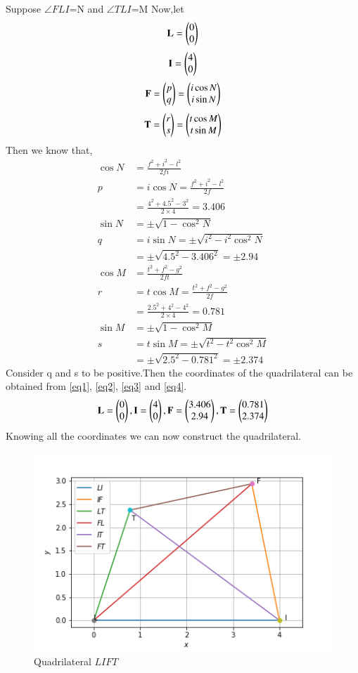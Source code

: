 \documentclass[journal,12pt,twocolumn]{IEEEtran}
\begin{document}
Suppose $\angle FLI$=N and  $\angle TLI$=M
Now,let
\begin{equation}
   \mathbf{L}=\begin{pmatrix}0\\0\end{pmatrix} \label{eq1}
\end{equation}
\begin{equation}
    \mathbf{I}=\begin{pmatrix}4\\0\end{pmatrix} \label{eq2}
\end{equation}
\begin{equation}
     \mathbf{F}=\begin{pmatrix}p\\q\end{pmatrix}=\begin{pmatrix}i\cos N\\i\sin N\end{pmatrix} \label{eq3}
\end{equation}
\begin{equation}
    \mathbf{T}=\begin{pmatrix}r\\s\end{pmatrix}=\begin{pmatrix}t\cos M\\t\sin M\end{pmatrix} \label{eq4}
\end{equation}
Then we know that,
\begin{align}
  \cos N&=\frac{f^2+i^2-l^2}{2fi}\\
    p&=i\cos N=\frac{f^2+i^2-l^2}{2f}\\
    &=\frac{4^2+4.5^2-3^2}{2\times 4}=3.406\\
   \sin N&=\pm\sqrt{1-\cos^2 N}\\
   q&=i\sin N=\pm\sqrt{i^2-i^2\cos^2 N}\\
   &=\pm\sqrt{4.5^2-3.406^2}=\pm2.94\\
   \cos M&=\frac{t^2+f^2-g^2}{2ft}\\
  r&= t\cos M=\frac{t^2+f^2-g^2}{2f}\\
    &=\frac{2.5^2+4^2-4^2}{2\times 4}=0.781\\
     \sin M&=\pm\sqrt{1-\cos^2 M}\\
  s&= t\sin M=\pm\sqrt{t^2-t^2\cos^2 M}\\
   &=\pm\sqrt{2.5^2-0.781^2}=\pm2.374
\end{align}
Consider q and s to be positive.Then the coordinates of the quadrilateral can be obtained from \ref{eq1}, \ref{eq2}, \ref{eq3} and \ref{eq4}.
\begin{equation}
\mathbf{L}=\begin{pmatrix}0\\0\end{pmatrix},\mathbf{I}=\begin{pmatrix}4\\0\end{pmatrix},\mathbf{F}=\begin{pmatrix}3.406\\2.94\end{pmatrix},\mathbf{T}=\begin{pmatrix}0.781\\2.374\end{pmatrix}
\end{equation}
Knowing all the coordinates we can now construct the quadrilateral.
\begin{figure}[H]
\centering
    \includegraphics[width= \columnwidth]{quad1.png}
    \caption{Quadrilateral $LIFT$}
\end{figure}
\end{document}
